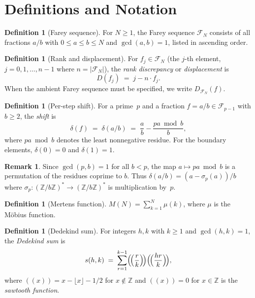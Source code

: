 \documentclass[11pt]{article}
\theoremstyle{definition}
\newtheorem{definition}[theorem]{Definition}
\newtheorem{remark}[theorem]{Remark}
\newcommand{\Z}{\mathbb{Z}}
\newcommand{\F}{\mathcal{F}}
\begin{document}
\section{Definitions and Notation}\label{sec:defs}

\begin{definition}[Farey sequence]\label{def:farey}
For $N \ge 1$, the Farey sequence $\F_N$ consists of all fractions
$a/b$ with $0 \le a \le b \le N$ and $\gcd(a,b) = 1$, listed in
ascending order.
\end{definition}

\begin{definition}[Rank and displacement]\label{def:rank}
For $f_j \in \F_N$ (the $j$-th element, $j = 0, 1, \ldots, n-1$
where $n = |\F_N|$), the \emph{rank discrepancy} or
\emph{displacement} is
\[
  D(f_j) \;=\; j - n \cdot f_j.
\]
When the ambient Farey sequence must be specified, we write
$D_{\F_N}(f)$.
\end{definition}

\begin{definition}[Per-step shift]\label{def:shift}
For a prime~$p$ and a fraction $f = a/b \in \F_{p-1}$ with $b \ge 2$,
the \emph{shift} is
\begin{equation}\label{eq:shift-def}
  \delta(f) \;=\; \delta(a/b) \;=\; \frac{a}{b} - \frac{pa \bmod b}{b},
\end{equation}
where $pa \bmod b$ denotes the least nonnegative residue.  For the
boundary elements, $\delta(0) = 0$ and $\delta(1) = 1$.
\end{definition}

\begin{remark}\label{rem:shift-permutation}
Since $\gcd(p, b) = 1$ for all $b < p$, the map
$a \mapsto pa \bmod b$ is a permutation of the residues coprime to $b$.
Thus $\delta(a/b) = (a - \sigma_p(a))/b$ where
$\sigma_p \colon (\Z/b\Z)^* \to (\Z/b\Z)^*$ is multiplication by~$p$.
\end{remark}

\begin{definition}[Mertens function]\label{def:mertens}
$M(N) = \sum_{k=1}^{N} \mu(k)$, where $\mu$ is the M\"obius function.
\end{definition}

\begin{definition}[Dedekind sum]\label{def:dedekind}
For integers $h, k$ with $k \ge 1$ and $\gcd(h,k) = 1$, the
\emph{Dedekind sum} is
\begin{equation}\label{eq:dedekind-def}
  s(h,k) \;=\; \sum_{r=1}^{k-1}
    \Bigl(\!\Bigl(\frac{r}{k}\Bigr)\!\Bigr)
    \Bigl(\!\Bigl(\frac{hr}{k}\Bigr)\!\Bigr),
\end{equation}
where $((x)) = x - \lfloor x \rfloor - 1/2$ for $x \notin \Z$ and
$((x)) = 0$ for $x \in \Z$ is the \emph{sawtooth function}.
\end{definition}
\end{document}
